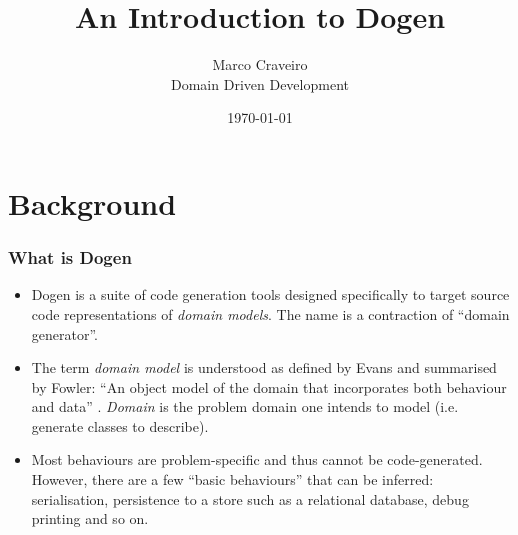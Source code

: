 \documentclass{beamer}
\title{An Introduction to Dogen}
\author{Marco Craveiro \\
  Domain Driven Development
}
\date{\today}
\begin{document}

\section{Background}

\begin{frame}
\frametitle{What is Dogen}

\begin{itemize}

\item Dogen is a suite of code generation tools designed specifically
  to target source code representations of \emph{domain models}. The
  name is a contraction of ``domain generator''.

\pause

\item The term \emph{domain model} is understood as defined by Evans
  \cite{Evans2004} and summarised by Fowler: ``An object model of the
  domain that incorporates both behaviour and data''
  \cite{Fowler2015}. \emph{Domain} is the problem domain one intends
  to model (i.e. generate classes to describe).

\pause

\item Most behaviours are problem-specific and thus cannot be
  code-generated. However, there are a few ``basic behaviours'' that
  can be inferred: serialisation, persistence to a store such as a
  relational database, debug printing and so on.

\end{itemize}

\end{frame}
\end{document}
